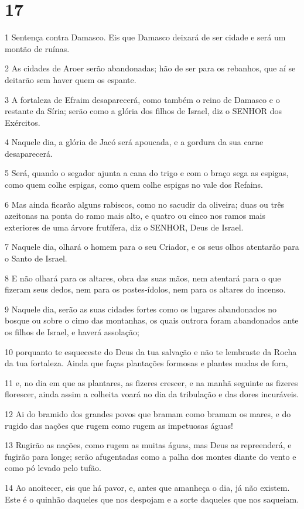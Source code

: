 \chapter{17}

\par 1 Sentença contra Damasco. Eis que Damasco deixará de ser cidade e será um montão de ruínas.
\par 2 As cidades de Aroer serão abandonadas; hão de ser para os rebanhos, que aí se deitarão sem haver quem os espante.
\par 3 A fortaleza de Efraim desaparecerá, como também o reino de Damasco e o restante da Síria; serão como a glória dos filhos de Israel, diz o SENHOR dos Exércitos.
\par 4 Naquele dia, a glória de Jacó será apoucada, e a gordura da sua carne desaparecerá.
\par 5 Será, quando o segador ajunta a cana do trigo e com o braço sega as espigas, como quem colhe espigas, como quem colhe espigas no vale dos Refains.
\par 6 Mas ainda ficarão alguns rabiscos, como no sacudir da oliveira; duas ou três azeitonas na ponta do ramo mais alto, e quatro ou cinco nos ramos mais exteriores de uma árvore frutífera, diz o SENHOR, Deus de Israel.
\par 7 Naquele dia, olhará o homem para o seu Criador, e os seus olhos atentarão para o Santo de Israel.
\par 8 E não olhará para os altares, obra das suas mãos, nem atentará para o que fizeram seus dedos, nem para os postes-ídolos, nem para os altares do incenso.
\par 9 Naquele dia, serão as suas cidades fortes como os lugares abandonados no bosque ou sobre o cimo das montanhas, os quais outrora foram abandonados ante os filhos de Israel, e haverá assolação;
\par 10 porquanto te esqueceste do Deus da tua salvação e não te lembraste da Rocha da tua fortaleza. Ainda que faças plantações formosas e plantes mudas de fora,
\par 11 e, no dia em que as plantares, as fizeres crescer, e na manhã seguinte as fizeres florescer, ainda assim a colheita voará no dia da tribulação e das dores incuráveis.
\par 12 Ai do bramido dos grandes povos que bramam como bramam os mares, e do rugido das nações que rugem como rugem as impetuosas águas!
\par 13 Rugirão as nações, como rugem as muitas águas, mas Deus as repreenderá, e fugirão para longe; serão afugentadas como a palha dos montes diante do vento e como pó levado pelo tufão.
\par 14 Ao anoitecer, eis que há pavor, e, antes que amanheça o dia, já não existem. Este é o quinhão daqueles que nos despojam e a sorte daqueles que nos saqueiam.

